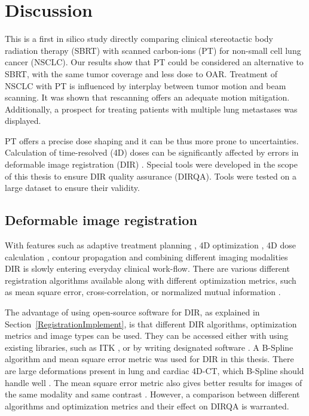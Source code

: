 \chapter{Discussion}

This is a first in silico study directly comparing clinical stereotactic body radiation therapy (SBRT) with scanned carbon-ions (PT) for non-small cell lung cancer (NSCLC). 
Our results show that PT could be considered an alternative to SBRT, with the same tumor coverage and less dose to OAR. Treatment of NSCLC with PT is influenced by 
interplay between tumor motion and beam scanning. It was shown that rescanning offers an
adequate motion mitigation. Additionally, a prospect for treating patients with multiple lung metastases was displayed.

PT offers a precise dose shaping and it can be thus more prone to uncertainties. Calculation of time-resolved (4D) doses can be significantly
affected by errors in deformable image registration (DIR) \cite{Heath2006}. Special tools were developed in the scope of this thesis to ensure DIR quality assurance (DIRQA).
Tools were tested on a large dataset to ensure their validity.


\section{Deformable image registration}

With features such as adaptive treatment planning \cite{Yan1997}, 4D optimization \cite{Trofimov2005}, 4D dose calculation \cite{Flampouri2006}, 
contour propagation \cite{Lu2006b} and combining different imaging modalities \cite{Leibfarth2013} DIR is slowly entering everyday clinical work-flow. 
There are various different registration algorithms available \cite{Varadhan2013}
along with different optimization metrics, such as mean square error, cross-correlation, or normalized mutual information \cite{Glocker2011}.

The advantage of using open-source software for DIR, as explained in Section~\ref{RegistrationImplement}, is that different DIR algorithms, 
optimization metrics and image types can be used. They can be accessed either with using
existing libraries, such as ITK \cite{Yoo2002}, or by writing designated software \cite{Fedorov2015}. A B-Spline algorithm and mean square error metric was used for DIR in this thesis. 
There are large deformations present in lung and cardiac
4D-CT, which B-Spline should handle well \cite{Tang2013}. The mean square error metric also gives better results for images of the same modality and same contrast \cite{Varadhan2013}. 
However, a comparison between different algorithms and optimization metrics and their effect on DIRQA is warranted.

